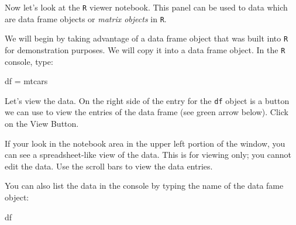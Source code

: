 \documentclass[
]{book}
\newenvironment{Shaded}{\begin{snugshade}}{\end{snugshade}}
\newcommand{\NormalTok}[1]{#1}
\newcommand{\StringTok}[1]{\textcolor[rgb]{0.31,0.60,0.02}{#1}}
\begin{document}
Now let's look at the \texttt{R} viewer notebook. This panel can be used to data which are data frame objects or \emph{matrix objects} in \texttt{R}.

We will begin by taking advantage of a data frame object that was built into \texttt{R} for demonstration purposes. We will copy it into a data frame object. In the \texttt{R} console, type:

\begin{Shaded}
\begin{Highlighting}[]
\NormalTok{df =}\StringTok{ }\NormalTok{mtcars}
\end{Highlighting}
\end{Shaded}

Let's view the data. On the right side of the entry for the \texttt{df} object is a button we can use to view the entries of the data frame (see green arrow below). Click on the View Button.

If your look in the notebook area in the upper left portion of the window, you can see a spreadsheet-like view of the data. This is for viewing only; you cannot edit the data. Use the scroll bars to view the data entries.

You can also list the data in the console by typing the name of the data fame object:

\begin{Shaded}
\begin{Highlighting}[]
\NormalTok{df}
\end{Highlighting}
\end{Shaded}
\end{document}
